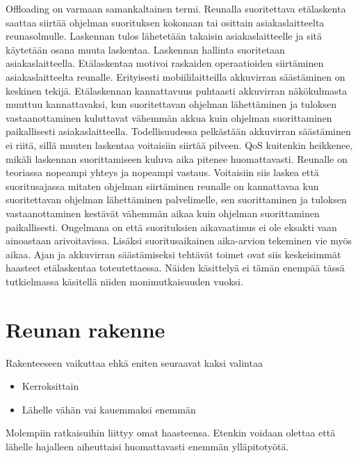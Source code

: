 \documentclass[finnish]{tktltiki2}
\theoremstyle{definition}
\theoremstyle{remark}
\begin{document}
Offloading on varmaan samankaltainen termi.
Reunalla suoritettava etälaskenta saattaa siirtää ohjelman suorituksen kokonaan tai osittain asiakaslaitteelta reunasolmulle. Laskennan tulos lähetetään takaisin asiakaslaitteelle ja sitä käytetään osana muuta laskentaa. 
Laskennan hallinta suoritetaan asiakaslaitteella. Etälaskentaa motivoi raskaiden operaatioiden siirtäminen asiakaslaitteelta reunalle. Erityisesti mobiililaitteilla akkuvirran säästäminen on keskinen tekijä. Etälaskennan kannattavuus puhtaasti akkuvirran näkökulmasta muuttuu kannattavaksi, kun suoritettavan ohjelman lähettäminen ja tuloksen vastaanottaminen kuluttavat vähemmän akkua kuin ohjelman suorittaminen paikallisesti asiakaslaitteella.
Todellisuudessa pelkästään akkuvirran säästäminen ei riitä, sillä muuten laskentaa voitaisiin siirtää pilveen. QoS kuitenkin heikkenee, mikäli laskennan suorittamiseen kuluva aika pitenee huomattavasti.
Reunalle on teoriassa nopeampi yhteys ja nopeampi vastaus. Voitaisiin siis laskea että suoritusajassa mitaten ohjelman siirtäminen reunalle on kannattavaa kun suoritettavan ohjelman lähettäminen palvelimelle, sen suorittaminen ja tuloksen vastaanottaminen kestävät vähemmän aikaa kuin ohjelman suorittaminen paikallisesti. 
Ongelmana on että suorituksien aikavaatimus ei ole eksakti vaan ainoastaan arivoitavissa. Lisäksi suoritusaikainen aika-arvion tekeminen vie myös aikaa. 
Ajan ja akkuvirran säästämiseksi tehtävät toimet ovat siis keskeisimmät haasteet etälaskentaa toteutettaessa. Näiden käsittelyä ei tämän enempää tässä tutkielmassa käsitellä niiden monimutkaisuuden vuoksi.








\section{Reunan rakenne}
Rakenteeseen vaikuttaa ehkä eniten seuraavat kaksi valintaa
\begin{itemize}
\item Kerroksittain
\item Lähelle vähän vai kauemmaksi enemmän
\end{itemize}
Molempiin ratkaisuihin liittyy omat haasteensa. Etenkin voidaan olettaa että lähelle hajalleen aiheuttaisi huomattavasti enemmän ylläpitotyötä.
\cite{mao17} 

\end{document}
